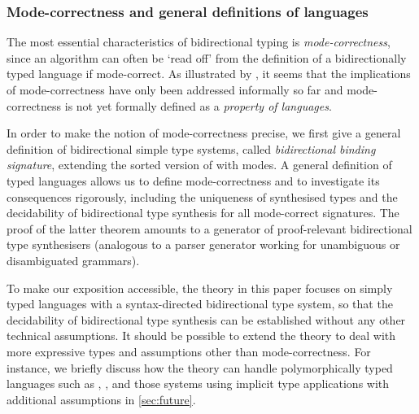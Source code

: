 

\subsubsection{Mode-correctness and general definitions of languages}
\label{sec:language-formalisation}
The most essential characteristics of bidirectional typing is \emph{mode-correctness}, since an algorithm can often be `read off' from the definition of a bidirectionally typed language if mode-correct.
As illustrated by \citet{Dunfield2021}, it seems that the implications of mode-correctness have only been addressed informally so far and mode-correctness is not yet formally defined as a \emph{property of languages}.

In order to make the notion of mode-correctness precise, we first give a general definition of bidirectional simple type systems, called \emph{bidirectional binding signature}, extending the sorted version of  with modes.
A general definition of typed languages allows us to define mode-correctness and to investigate its consequences rigorously, including the uniqueness of synthesised types and the decidability of bidirectional type synthesis for all mode-correct signatures.
The proof of the latter theorem amounts to a generator of proof-relevant bidirectional type synthesisers (analogous to a parser generator working for unambiguous or disambiguated grammars).

To make our exposition accessible, the theory in this paper focuses on simply typed languages with a syntax-directed bidirectional type system, so that the decidability of bidirectional type synthesis can be established without any other technical assumptions.
It should be possible to extend the theory to deal with more expressive types and assumptions other than mode-correctness.
For instance, we briefly discuss how the theory can handle polymorphically typed languages such as \SystemF, \SystemFsub, and those systems using implicit type applications with additional assumptions in \cref{sec:future}.

